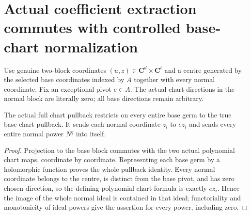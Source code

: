\section{Actual coefficient extraction commutes with controlled base-chart normalization}
\label{sec:hironaka-actual-coefficient-controlled-transform}
Use genuine two-block coordinates $(u,z)\in\mathbf C^d\times\mathbf C^t$ and a centre generated by the selected base coordinates indexed by $A$ together with every normal coordinate. Fix an exceptional pivot $e\in A$. The actual chart directions in the normal block are literally zero; all base directions remain arbitrary.

\begin{theorem}
\label{hir:actual-coefficient-controlled-chart-equations}
\leanok
The actual full chart pullback restricts on every entire base germ to the true base-chart pullback. It sends each normal coordinate $z_i$ to $e z_i$ and sends every entire normal power $N^q$ into itself.
\end{theorem}
\begin{proof}
Projection to the base block commutes with the two actual polynomial chart maps, coordinate by coordinate. Representing each base germ by a holomorphic function proves the whole pullback identity. Every normal coordinate belongs to the centre, is distinct from the base pivot, and has zero chosen direction, so the defining polynomial chart formula is exactly $ez_i$. Hence the image of the whole normal ideal is contained in that ideal; functoriality and monotonicity of ideal powers give the assertion for every power, including zero.
\end{proof}

